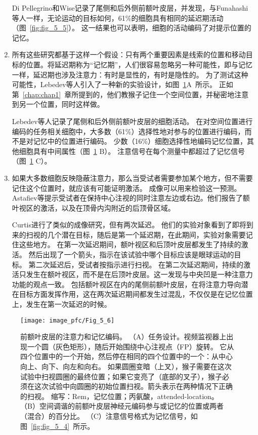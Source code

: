 \begin{enumerate}
	Di Pellegrino和Wise记录了尾侧和后外侧前额叶皮层，并发现，与Funahashi等人一样，无论运动的目标如何，61\%的细胞具有相同的延迟期活动（图~\ref{fig:fig_5_5}）。
	这一结果也可以表明，细胞的活动编码了对提示位置的记忆。
	\item 所有这些研究都基于这样一个假设：只有两个重要因素是线索的位置和移动目标的位置。将延迟期称为“记忆期”，人们很容易忽略另一种可能性，即与记忆一样，延迟期也涉及注意力：有时是显性的，有时是隐性的。
	为了测试这种可能性，Lebedev等人\cite{lebedev2004representation}引入了一种新的实验设计，如图~\ref{fig:fig_5_6}A~所示。
	正如第~\ref{chap:chap1}~章所提到的，他们教猴子记住一个空间位置，并秘密地注意到另一个位置，同时这样做。
	
	Lebedev等人记录了尾侧和后外侧前额叶皮层的细胞活动。
	在对空间位置进行编码的任务相关细胞中，大多数（61\%）选择性地对参与的位置进行编码，而不是对记忆中的位置进行编码。
	少数（16\%）细胞选择性地编码记忆位置，其他细胞具有中间属性（图~\ref{fig:fig_5_6} B）。
	注意信号在每个测量中都超过了记忆信号（图~\ref{fig:fig_5_6} C）。
	\item 如果大多数细胞反映隐蔽注意力，那么当受试者需要参加某个地方，但不需要记住这个位置时，就应该有可能证明激活。
	成像可以用来检验这一预测。
	Astafiev等\cite{astafiev2003functional}提示受试者在保持中心注视的同时注意左边或右边。他们报告了额叶视区的激活，以及在顶骨内沟附近的后顶骨区域。
	
	Curtis\cite{curtis2006selection}进行了类似的成像研究，但有两次延迟。
	他们的实验对象看到了即将到来的扫视的几个潜在目标，随后是第一个延迟期，在此期间，实验对象需要记住这些地方。
	在第一次延迟期间，额叶视区和后顶叶皮层都发生了持续的激活。
	然后出现了一个箭头，指示在该试验中哪个目标应该是眼球运动的目标。
	第二次延迟后，受试者按指示进行扫视。
	在第二次延迟期间，持续的激活只发生在额叶视区，而不是在后顶叶皮层。这一发现与中央凹是一种注意力功能的观点一致。
	包括额叶视区在内的尾侧前额叶皮层，在将注意力导向潜在目标方面发挥作用，这在两次延迟期间都发生过混乱，不仅仅是在记忆位置上，发生在第一次延迟的时候。
\end{enumerate}


\begin{figure}
	\centering
	\texttt{[image: image\_pfc/Fig\_5\_6]}
	\caption{前额叶皮层的注意力和记忆编码。
		（A）任务设计。视频监视器上出现一个圆（灰色矩形），随后开始围绕中心注视点（FP）旋转。
		它从四个位置中的一个开始，然后停在相同的四个位置中的一个：从中心向上、向下、向左和向右。
		如果圆圈变暗（上叉），猴子需要在这次试验中扫视圆圈的最终位置；如果它变亮了（底部的叉子），猴子必须在这次试验中向圆圈的初始位置扫视。箭头表示在两种情况下正确的扫视。
		缩写：Rem，记忆位置；丙氨酸，attended-location。
		（B）空间调谐的前额叶皮层神经元编码参与或记忆的位置或两者（混合）的百分比。
		（C）注意信号格式为记忆信号，如图~\ref{fig:fig_5_4}~所示\cite{lebedev2004representation}。}
	\label{fig:fig_5_6}
\end{figure}


